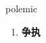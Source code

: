 
\begin{frame}
{\huge polemic}
\begin{center}
\begin{enumerate}\Large
  \item \textbf{争执}
\end{enumerate}
\end{center}
\end{frame}

